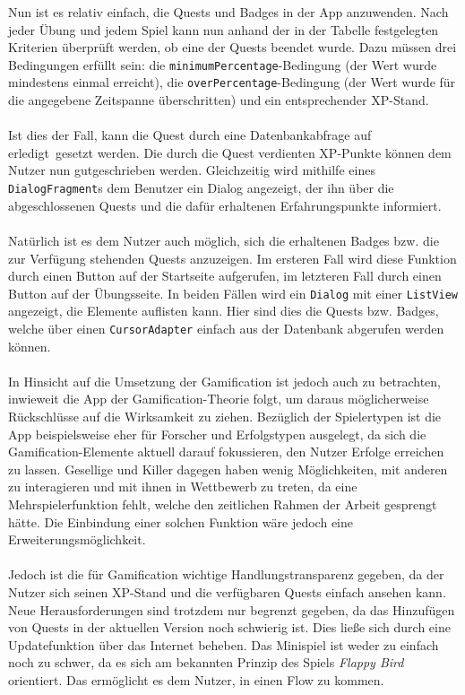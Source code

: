 Nun ist es relativ einfach, die Quests und Badges in der App anzuwenden. Nach jeder Übung und jedem Spiel kann nun anhand der in der Tabelle festgelegten Kriterien überprüft werden, ob eine der Quests beendet wurde. Dazu müssen drei Bedingungen erfüllt sein: die \texttt{minimumPercentage}-Bedingung (der Wert wurde mindestens einmal erreicht), die \texttt{overPercentage}-Bedingung (der Wert wurde für die angegebene Zeitspanne überschritten) und ein entsprechender XP-Stand. \\ \\
Ist dies der Fall, kann die Quest durch eine Datenbankabfrage auf \glqq erledigt\grqq ~gesetzt werden. Die durch die Quest verdienten XP-Punkte können dem Nutzer nun gutgeschrieben werden. Gleichzeitig wird mithilfe eines \texttt{DialogFragment}s dem Benutzer ein Dialog angezeigt, der ihn über die abgeschlossenen Quests und die dafür erhaltenen Erfahrungspunkte informiert. \\ \\
Natürlich ist es dem Nutzer auch möglich, sich die erhaltenen Badges bzw. die zur Verfügung stehenden Quests anzuzeigen. Im ersteren Fall wird diese Funktion durch einen Button auf der Startseite aufgerufen, im letzteren Fall durch einen Button auf der Übungsseite. In beiden Fällen wird ein \texttt{Dialog} mit einer \texttt{ListView} angezeigt, die Elemente auflisten kann. Hier sind dies die Quests bzw. Badges, welche über einen \texttt{CursorAdapter} einfach aus der Datenbank abgerufen werden können. \\ \\
In Hinsicht auf die Umsetzung der Gamification ist jedoch auch zu betrachten, inwieweit die App der Gamification-Theorie folgt, um daraus möglicherweise Rückschlüsse auf die Wirksamkeit zu ziehen. Bezüglich der Spielertypen ist die App beispielsweise eher für Forscher und Erfolgstypen ausgelegt, da sich die Gamification-Elemente aktuell darauf fokussieren, den Nutzer Erfolge erreichen zu lassen. Gesellige und Killer dagegen haben wenig Möglichkeiten, mit anderen zu interagieren und mit ihnen in Wettbewerb zu treten, da eine Mehrspielerfunktion fehlt, welche den zeitlichen Rahmen der Arbeit gesprengt hätte. Die Einbindung einer solchen Funktion wäre jedoch eine Erweiterungsmöglichkeit. \\ \\
Jedoch ist die für Gamification wichtige Handlungstransparenz gegeben, da der Nutzer sich seinen XP-Stand und die verfügbaren Quests einfach ansehen kann. Neue Herausforderungen sind trotzdem nur begrenzt gegeben, da das Hinzufügen von Quests in der aktuellen Version noch schwierig ist. Dies ließe sich durch eine Updatefunktion über das Internet beheben. Das Minispiel ist weder zu einfach noch zu schwer, da es sich am bekannten Prinzip des Spiels \textit{Flappy Bird} orientiert. Das ermöglicht es dem Nutzer, in einen Flow zu kommen. \\ \\

